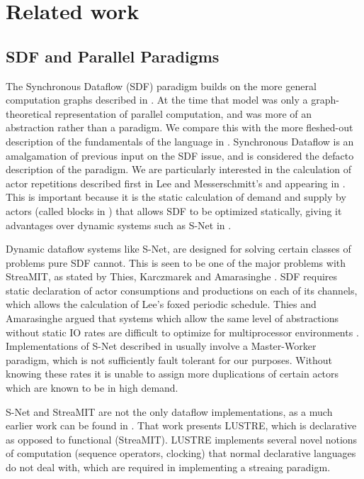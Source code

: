 \chapter{Related work}

\section{SDF and Parallel Paradigms}

The Synchronous Dataflow (SDF) paradigm builds on the more general computation graphs described in \cite{kar66}.
At the time that model was only a graph-theoretical representation of parallel computation, and was more of an abstraction rather than a paradigm.
We compare this with the more fleshed-out description of the fundamentals of the language in \cite{sdfBook}.
Synchronous Dataflow is an amalgamation of previous input on the SDF issue, and is considered the defacto description of the paradigm.
We are particularly interested in the calculation of actor repetitions described first in Lee and Messerschmitt's \cite{lee87} and appearing in \cite{sdfBook}.
This is important because it is the static calculation of demand and supply by actors (called blocks in \cite{lee87}) that allows SDF to be optimized statically, giving it advantages over dynamic systems such as S-Net in \cite{pen09}.

Dynamic dataflow systems like S-Net, are designed for solving certain classes of problems pure SDF cannot.
This is seen to be one of the major problems with StreaMIT, as stated by Thies, Karczmarek and Amarasinghe \cite{thies02}.
SDF requires static declaration of actor consumptions and productions on each of its channels, which allows the calculation of Lee's foxed periodic schedule.
Thies and Amarasinghe argued that systems which allow the same level of abstractions without static IO rates are difficult to optimize for multiprocessor environments \cite{thies10}.
Implementations of S-Net described in \cite{pen09} usually involve a Master-Worker paradigm, which is not sufficiently fault tolerant for our purposes.
Without knowing these rates it is unable to assign more duplications of certain actors which are known to be in high demand.

S-Net and StreaMIT are not the only dataflow implementations, as a much earlier work can be found in \cite{cas87}.
That work presents LUSTRE, which is declarative as opposed to functional (StreaMIT).
LUSTRE implements several novel notions of computation (sequence operators, clocking) that normal declarative languages do not deal with, which are required in implementing a streaing paradigm.

